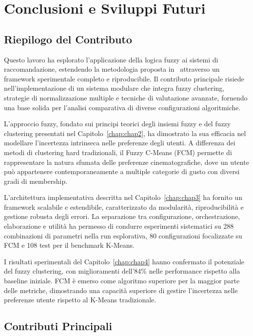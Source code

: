 \chapter{Conclusioni e Sviluppi Futuri}
\label{chap:chap5}

\section{Riepilogo del Contributo}

Questo lavoro ha esplorato l'applicazione della logica fuzzy ai sistemi di raccomandazione, estendendo la metodologia proposta in~\cite{KOOHI2016134} attraverso un framework sperimentale completo e riproducibile. Il contributo principale risiede nell'implementazione di un sistema modulare che integra fuzzy clustering, strategie di normalizzazione multiple e tecniche di valutazione avanzate, fornendo una base solida per l'analisi comparativa di diverse configurazioni algoritmiche.

L'approccio fuzzy, fondato sui principi teorici degli insiemi fuzzy e del fuzzy clustering presentati nel Capitolo~\ref{chap:chap2}, ha dimostrato la sua efficacia nel modellare l'incertezza intrinseca nelle preferenze degli utenti. A differenza dei metodi di clustering hard tradizionali, il Fuzzy C-Means (FCM) permette di rappresentare la natura sfumata delle preferenze cinematografiche, dove un utente può appartenere contemporaneamente a multiple categorie di gusto con diversi gradi di membership.

L'architettura implementativa descritta nel Capitolo~\ref{chap:chap3} ha fornito un framework scalabile e estendibile, caratterizzato da modularità, riproducibilità e gestione robusta degli errori. La separazione tra configurazione, orchestrazione, elaborazione e utilità ha permesso di condurre esperimenti sistematici su 288 combinazioni di parametri nella run esplorativa, 80 configurazioni focalizzate su FCM e 108 test per il benchmark K-Means.

I risultati sperimentali del Capitolo~\ref{chap:chap4} hanno confermato il potenziale del fuzzy clustering, con miglioramenti dell'84\% nelle performance rispetto alla baseline iniziale. FCM è emerso come algoritmo superiore per la maggior parte delle metriche, dimostrando una capacità superiore di gestire l'incertezza nelle preferenze utente rispetto al K-Means tradizionale.

\section{Contributi Principali}

